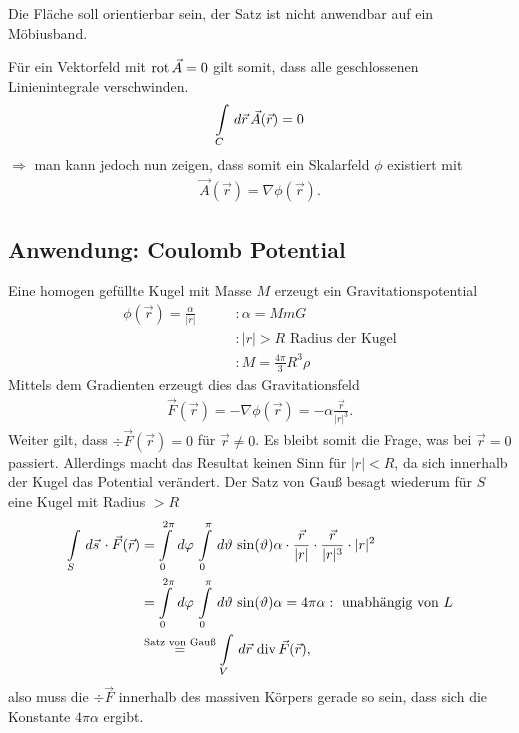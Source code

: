 \begin{Bemerkung}
Die Fläche soll orientierbar sein, der Satz ist nicht anwendbar auf ein
Möbiusband.
\end{Bemerkung}
\par
Für ein Vektorfeld mit $\operatorname{rot} \vec{A} = 0$ gilt somit, dass alle geschlossenen
Linienintegrale verschwinden.
\begin{align*}
\int \limits_{C} \,d\vec{r}\, \vec{A}(\vec{r}) = 0
\end{align*}
$\Rightarrow$ man kann jedoch nun zeigen, dass somit ein Skalarfeld $\phi$
existiert mit
\begin{align*}
\vec{A}(\vec{r}) = \nabla\phi(\vec{r}).
\end{align*}


\subsection{Anwendung: Coulomb Potential}
Eine homogen gefüllte Kugel mit Masse $M$ erzeugt ein Gravitationspotential
\begin{align*}
\phi(\vec{r}) = \frac{\alpha}{|r|} \qquad & : \alpha = MmG\\
& : |r| > R \text{ Radius der Kugel}\\
& : M = \frac{4\pi}{3}R^3\rho 
\end{align*}
Mittels dem Gradienten erzeugt dies das Gravitationsfeld
\begin{align*}
\vec{F}(\vec{r}) = -\nabla\phi(\vec{r}) = -\alpha \frac{\vec{r}}{|r|^3}.
\end{align*}
Weiter gilt, dass $\div \vec{F}(\vec{r}) = 0$ für $\vec{r}\neq0$. Es bleibt
somit die Frage, was bei $\vec{r} = 0$ passiert. Allerdings macht das
Resultat keinen Sinn für $|r| < R$, da sich innerhalb der Kugel das Potential
verändert. Der Satz von Gauß besagt wiederum für $S$ eine Kugel mit Radius $> R$
\begin{align*}
\int \limits_{S}\,d\vec{s}\, \cdot\vec{F}(\vec{r}) &= \int
\limits_{0}^{2\pi}\,d\varphi\, \int \limits_{0}^{\pi}\,d\vartheta\, \sin(\vartheta) \alpha \cdot
\frac{\vec{r}}{|r|}\cdot\frac{\vec{r}}{|r|^3}\cdot|r|^2 \\
&= \int
\limits_{0}^{2\pi}\,d\varphi\, \int\limits_{0}^{\pi}\,d\vartheta\, \sin(\vartheta) \alpha =
4\pi\alpha : \text{ unabhängig von } L\\
&\overset{\text{Satz von Gauß}}{=} \int \limits_{V}\,d\vec{r}\,
\operatorname{div}\vec{F}(\vec{r}),
\end{align*}
also muss die $\div \vec{F}$ innerhalb des
massiven Körpers gerade so sein, dass sich die Konstante $4\pi\alpha$ ergibt.
